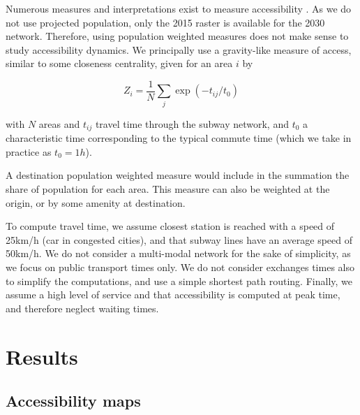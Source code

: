\documentclass{article}
\begin{document}
Numerous measures and interpretations exist to measure accessibility \cite{levinson2020towards}. As we do not use projected population, only the 2015 raster is available for the 2030 network. Therefore, using population weighted measures does not make sense to study accessibility dynamics. We principally use a gravity-like measure of access, similar to some closeness centrality, given for an area $i$ by

\begin{equation}
\label{eq:access}
Z_i = \frac{1}{N} \sum_j \exp\left(-t_{ij} / t_0\right)
\end{equation}

with $N$ areas and $t_{ij}$ travel time through the subway network, and $t_0$ a characteristic time corresponding to the typical commute time (which we take in practice as $t_0 = 1h$).

A destination population weighted measure would include in the summation the share of population for each area. This measure can also be weighted at the origin, or by some amenity at destination.

To compute travel time, we assume closest station is reached with a speed of 25km/h (car in congested cities), and that subway lines have an average speed of 50km/h. We do not consider a multi-modal network for the sake of simplicity, as we focus on public transport times only. We do not consider exchanges times also to simplify the computations, and use a simple shortest path routing. Finally, we assume a high level of service and that accessibility is computed at peak time, and therefore neglect waiting times.


\section{Results}


\subsection{Accessibility maps}
\end{document}
